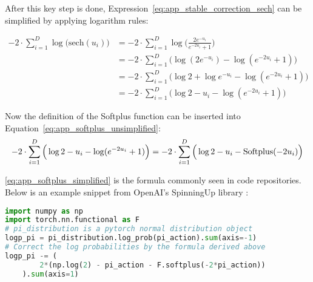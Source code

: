 After this key step is done, Expression~\ref{eq:app_stable_correction_sech} can be simplified by applying logarithm rules:

\begin{align}
- 2 \cdot \sum_{i=1}^D \log \Big( \text{sech} (u_i) \Big) & = - 2 \cdot \sum_{i=1}^D \log \Big( \frac{2e^{-u_i}}{e^{-2u_i} + 1} \Big) \nonumber \\
& = - 2 \cdot \sum_{i=1}^D \Big( \log (2e^{-u_i}) - \log (e^{-2u_i} + 1) \Big) \nonumber \\
& = - 2 \cdot \sum_{i=1}^D \Big( \log 2 + \log e^{-u_i} - \log (e^{-2u_i} + 1) \Big) \nonumber \\
& = - 2 \cdot \sum_{i=1}^D \Big( \log 2 -u_i - \log (e^{-2u_i} + 1) \Big)\label{eq:app_softplus_unsimplified}
\end{align}

Now the definition of the Softplus function can be inserted into Equation~\ref{eq:app_softplus_unsimplified}:
\begin{gather}\label{eq:app_softplus_simplified}
- 2 \cdot \sum_{i=1}^D \Big( \log 2 -u_i - \log (e^{-2u_i} + 1) \Big) = - 2 \cdot \sum_{i=1}^D \Big( \log 2 -u_i - \operatorname{Softplus}(-2u_i) \Big)
\end{gather}

\ref{eq:app_softplus_simplified} is the formula commonly seen in code repositories. Below is an example snippet from OpenAI's SpinningUp library \cite{achiamSpinningDeepReinforcement2018}:
\begin{lstlisting}[language=Python, deletekeywords={sum}]
import numpy as np
import torch.nn.functional as F
# pi_distribution is a pytorch normal distribution object
logp_pi = pi_distribution.log_prob(pi_action).sum(axis=-1)
# Correct the log probabilities by the formula derived above
logp_pi -= (
        2*(np.log(2) - pi_action - F.softplus(-2*pi_action))
    ).sum(axis=1)
\end{lstlisting}

\clearpage
